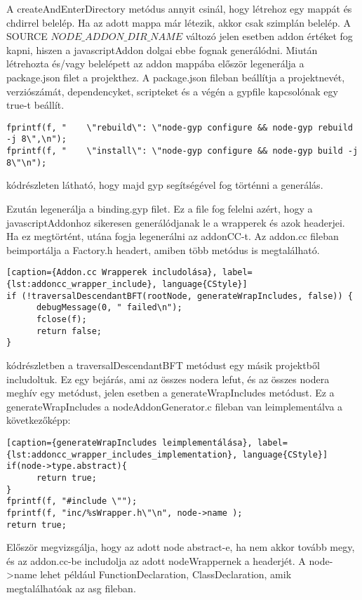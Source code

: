 A createAndEnterDirectory metódus annyit csinál, hogy létrehoz egy mappát és chdirrel belelép. Ha az adott mappa már létezik, akkor csak szimplán belelép.
A SOURCE $NODE\_ADDON\_DIR\_NAME$ változó jelen esetben addon értéket fog kapni, hiszen a javascriptAddon dolgai ebbe fognak generálódni.
Miután létrehozta és/vagy belelépett az addon mappába először legenerálja a package.json filet a projekthez.
A package.json fileban beállítja a projektnevét, verziószámát, dependencyket, scripteket és a végén a gypfile kapcsolónak egy true-t beállít.
\begin{lstlisting}[caption={NodeAddonGenerator package.json scripts}, label={lst:nodeAddonGenerator_package_json}, language={CStyle}]
fprintf(f, "    \"rebuild\": \"node-gyp configure && node-gyp rebuild -j 8\",\n");
fprintf(f, "    \"install\": \"node-gyp configure && node-gyp build -j 8\"\n");
\end{lstlisting}
 kódrészleten látható, hogy majd gyp segítségével fog történni a generálás.

\noindent

Ezután legenerálja a binding.gyp filet.
Ez a file fog felelni azért, hogy a javascriptAddonhoz sikeresen generálódjanak le a wrapperek és azok headerjei. Ha ez megtörtént, utána fogja legenerálni az addonCC-t.
Az addon.cc fileban beimportálja a Factory.h headert, amiben több metódus is megtalálható.
\begin{lstlisting}[caption={Addon.cc Wrapperek includolása}, label={lst:addoncc_wrapper_include}, language{CStyle}]
if (!traversalDescendantBFT(rootNode, generateWrapIncludes, false)) {
      debugMessage(0, " failed\n");
      fclose(f);
      return false;
}
\end{lstlisting}

 kódrészletben a traversalDescendantBFT metódust egy másik projektből includoltuk.
Ez egy bejárás, ami az összes nodera lefut, és az összes nodera meghív egy metódust, jelen esetben a generateWrapIncludes metódust.
Ez a generateWrapIncludes a nodeAddonGenerator.c fileban van leimplementálva a következőképp:
\begin{lstlisting}[caption={generateWrapIncludes leimplementálása}, label={lst:addoncc_wrapper_includes_implementation}, language{CStyle}]
if(node->type.abstract){
      return true;
}
fprintf(f, "#include \"");
fprintf(f, "inc/%sWrapper.h\"\n", node->name );
return true;
\end{lstlisting}
Először megvizsgálja, hogy az adott node abstract-e, ha nem akkor tovább megy, és az addon.cc-be includolja az adott nodeWrappernek a headerjét.
A node->name lehet például FunctionDeclaration, ClassDeclaration, amik megtalálhatóak az asg fileban.

